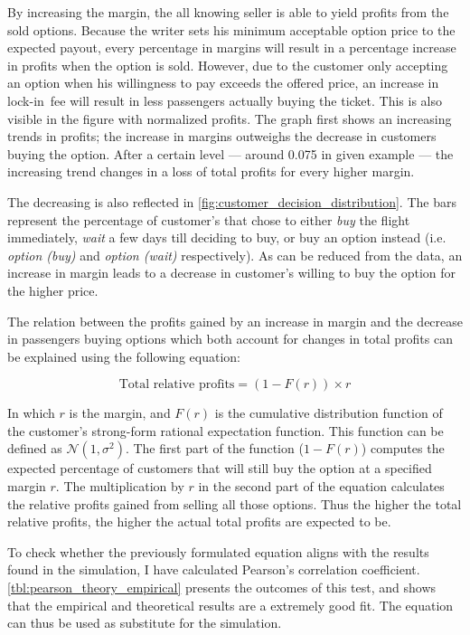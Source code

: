 
By increasing the margin, the all knowing seller is able to yield profits from the sold options. Because the writer sets his minimum acceptable option price to the expected payout, every percentage in margins will result in a percentage increase in profits when the option is sold. However, due to the customer only accepting an option when his willingness to pay exceeds the offered price, an increase in lock-in~fee will result in less passengers actually buying the ticket. This is also visible in the figure with normalized profits. The graph first shows an increasing trends in profits; the increase in margins outweighs the decrease in customers buying the option. After a certain level --- around 0.075 in given example --- the increasing trend changes in a loss of total profits for every higher margin.

The decreasing is also reflected in \autoref{fig:customer_decision_distribution}. The bars represent the percentage of customer's that chose to either \emph{buy} the flight immediately, \emph{wait} a few days till deciding to buy, or buy an option instead (i.e. \emph{option (buy)} and \emph{option (wait)} respectively). As can be reduced from the data, an increase in margin leads to a decrease in customer's willing to buy the option for the higher price.


The relation between the profits gained by an increase in margin and the decrease in passengers buying options which both account for changes in total profits can be explained using the following equation:

$$ \mbox{Total relative profits} = (1 - F(r)) \times r $$

In which $r$ is the margin, and $F(r)$ is the cumulative distribution function of the customer's strong-form rational expectation function. This function can be defined as $\mathcal{N}(1, \sigma^2)$. The first part of the function ($1 - F(r)$) computes the expected percentage of customers that will still buy the option at a specified margin $r$. The multiplication by $r$ in the second part of the equation calculates the relative profits gained from selling all those options. Thus the higher the total relative profits, the higher the actual total profits are expected to be.

To check whether the previously formulated equation aligns with the results found in the simulation, I have calculated Pearson's correlation coefficient. \autoref{tbl:pearson_theory_empirical} presents the outcomes of this test, and shows that the empirical and theoretical results are a extremely good fit. The equation can thus be used as substitute for the simulation.

